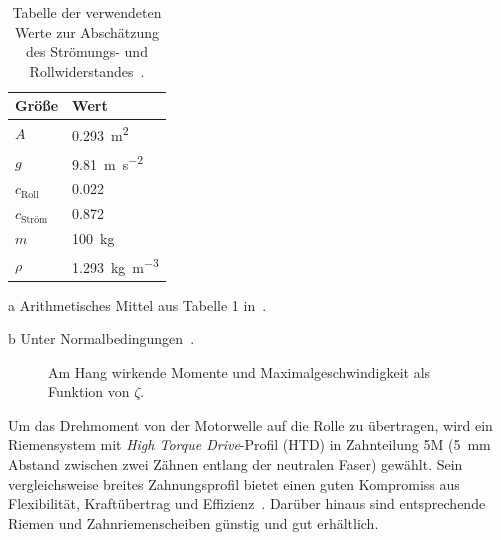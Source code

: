 		\begin{table}[h]
			\caption[Tabelle der verwendeten Werte zur Abschätzung des Strömungs- und Rollwiderstandes]{Tabelle der verwendeten Werte zur Abschätzung des Strömungs- und Rollwiderstandes~\cites{GESTIS.Luft}{material.advances.skateboarding.WATERMAN1978}{air.drag.human.body.VANINGENSCHENAU1982}.}%
			\label{tab:drag roll values}
			\centering
			\begin{threeparttable}
				\begin{tabular}{ll}
					\toprule
					Größe\hspace{1cm}								& Wert\\ \midrule
					\(A\)\tnote{a}\hspace{1cm}						& \qty{0,293}{\metre\squared}\\
					\(g\)											& \qty{9,81}{\metre\per\second\squared}\\
					\(c_\text{Roll}\)\hspace{1cm}					& \num{0,022}\\
					\(c_\text{Ström}\)\tnote{a}\hspace{1cm}			& \num{0,872}\\
					\(m\)											& \qty{100}{\kilo\gram}\\
					\(\rho\)\tnote{b}\hspace{1cm}					& \qty{1,293}{\kilo\gram\per\metre\cubed}\\ \bottomrule
				\end{tabular}
				\begin{tablenotes}\footnotesize
					\item[a]	Arithmetisches Mittel aus Tabelle 1 in~\cite{air.drag.human.body.VANINGENSCHENAU1982}.
					\item[b]	Unter Normalbedingungen~\cite{GESTIS.Luft}.
				\end{tablenotes}
			\end{threeparttable}
		\end{table}
		\begin{figure}[h]
			\centering
			
			\caption[Am Hang wirkende Momente und Maximalgeschwindigkeit als Funktion von \(\zeta\)]{Am Hang wirkende Momente und Maximalgeschwindigkeit als Funktion von \(\zeta\).}%
			\label{fig:torque ratio and vmax vs zetas}
		\end{figure}\par\medskip
		Um das Drehmoment von der Motorwelle auf die Rolle zu übertragen, wird ein Riemensystem mit \textit{High Torque Drive}-Profil (HTD) in Zahnteilung 5M (\qty{5}{mm} Abstand zwischen zwei Zähnen entlang der neutralen Faser) gewählt. 
		Sein vergleichsweise breites Zahnungsprofil bietet einen guten Kompromiss aus Flexibilität, Kraftübertrag und Effizienz~\cite{gates.catalogue.2021}.
		Darüber hinaus sind entsprechende Riemen und Zahnriemenscheiben günstig und gut erhältlich.
		
